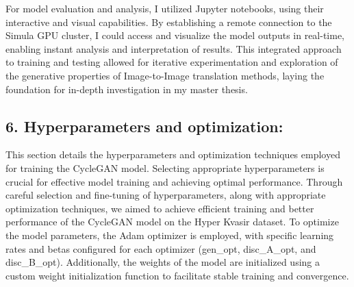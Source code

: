 \documentclass[UKenglish,12pt]{master-style}
\begin{document}
For model evaluation and analysis, I utilized Jupyter notebooks, using their interactive and visual capabilities. By establishing a remote connection to the Simula GPU cluster, I could access and visualize the model outputs in real-time, enabling instant analysis and interpretation of results. This integrated approach to training and testing allowed for iterative experimentation and exploration of the generative properties of Image-to-Image translation methods, laying the foundation for in-depth investigation in my master thesis.

\subsection*{6. Hyperparameters and optimization:}

This section details the hyperparameters and optimization techniques employed for training the CycleGAN model. Selecting appropriate hyperparameters is crucial for effective model training and achieving optimal performance. Through careful
selection and fine-tuning of hyperparameters, along with appropriate optimization techniques, we aimed to achieve efficient training and better performance of the CycleGAN model on the Hyper Kvasir dataset. To optimize the model parameters, the Adam optimizer is employed, with specific learning rates and betas configured for each optimizer (gen\_opt, disc\_A\_opt, and disc\_B\_opt). Additionally, the weights of the model are initialized using a custom weight initialization function to facilitate stable training and convergence. 
\end{document}
